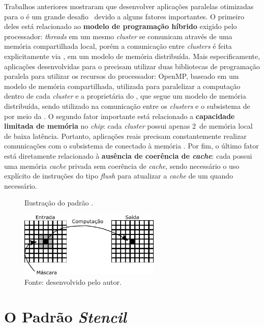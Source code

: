 Trabalhos anteriores mostraram que desenvolver aplicações paralelas otimizadas
para o \mppa é um grande desafio~\cite{Castro-IA3-JPDC:2014} devido a alguns
fatores importantes. O primeiro deles está relacionado ao \textbf{modelo de
    programação híbrido} exigido pelo processador: \textit{threads} em um mesmo
\textit{cluster} se comunicam através de uma memória compartilhada local, porém
a comunicação entre \textit{clusters} é feita explicitamente via \noc, em um
modelo de memória distribuída. Mais especificamente, aplicações desenvolvidas
para o \mppa precisam utilizar duas bibliotecas de programação paralela para
utilizar os recursos do processador: OpenMP, baseado em um modelo de memória
compartilhada, utilizada para paralelizar a computação dentro de cada
\textit{cluster} e a \api proprietária do \mppa, que segue um modelo de memória
distribuída, sendo utilizado na comunicação entre os \textit{clusters} e o
subsistema de \io por meio da \noc. O segundo fator importante está relacionado a
\textbf{capacidade limitada de memória} no \textit{chip}: cada \textit{cluster}
possui apenas 2~\mb de memória local de baixa latência. Portanto, aplicações
reais precisam constantemente realizar comunicações com o subsistema de \io
conectado à memória \lpddr. Por fim, o último fator está diretamente relacionado
à \textbf{ausência de coerência de \textit{cache}}: cada \pe possui uma memória
\textit{cache} privada sem coerência de \textit{cache}, sendo necessário o uso
explícito de instruções do tipo \textit{flush} para atualizar a \textit{cache}
de um \pe quando necessário.


\begin{figure}[t]
	\centering
	\caption{Ilustração do padrão \stencil.}
	\includegraphics[width=0.6\textwidth]{figs/stencilComp.pdf}
    \caption*{Fonte: desenvolvido pelo autor.}
	\label{fig:stencil}
\end{figure}

\section{O Padrão \textit{Stencil}}
\label{sec:stencil}

